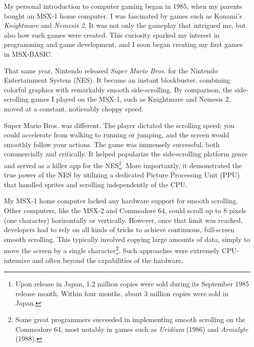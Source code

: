 \documentclass[book.tex]{subfiles}
\begin{document}
My personal introduction to computer gaming began in 1985, when my parents bought an MSX-1 home computer. I was fascinated by games such as Konami's \textit{Knightmare} and \textit{Nemesis 2}. It was not only the gameplay that intrigued me, but also how such games were created. This curiosity sparked my interest in programming and game development, and I soon began creating my first games in MSX-BASIC.\\

\par
That same year, Nintendo released \textit{Super Mario Bros.} for the Nintendo Entertainment System (NES). It became an instant blockbuster, combining colorful graphics with remarkably smooth side-scrolling. By comparison, the side-scrolling games I played on the MSX-1, such as Knightmare and Nemesis 2, moved at a constant, noticeably choppy speed.\\

\par
Super Mario Bros. was different. The player dictated the scrolling speed: you could accelerate from walking to running or jumping, and the screen would smoothly follow your actions. The game was immensely successful, both commercially and critically. It helped popularize the side-scrolling platform genre and served as a killer app for the NES\footnote{Upon release in Japan, 1.2 million copies were sold during its September 1985 release month. Within four months, about 3 million copies were sold in Japan.}. More importantly, it demonstrated the true power of the NES by utilizing a dedicated Picture Processing Unit (PPU) that handled sprites and scrolling independently of the CPU.\\


\par
My MSX-1 home computer lacked any hardware support for smooth scrolling. Other computers, like the MSX-2 and Commodore 64, could scroll up to 8 pixels (one character) horizontally or vertically. However, once that limit was reached, developers had to rely on all kinds of tricks to achieve continuous, full-screen smooth scrolling. This typically involved copying large amounts of data, simply to move the screen by a single character\footnote{Some great programmers succeeded in implementing smooth scrolling on the Commodore 64, most notably in games such as \textit{Uridium} (1986) and \textit{Armalyte} (1988).}. Such approaches were extremely CPU-intensive and often beyond the capabilities of the hardware.\\
\end{document}

